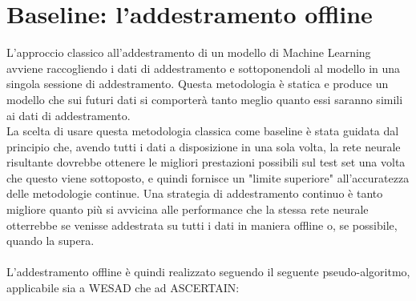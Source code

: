 \section{Baseline: l'addestramento offline}
L'approccio classico all'addestramento di un modello di Machine Learning avviene raccogliendo i dati di addestramento e sottoponendoli al modello in una singola sessione di addestramento. Questa metodologia è statica e produce un modello che sui futuri dati si comporterà tanto meglio quanto essi saranno simili ai dati di addestramento.\\
La scelta di usare questa metodologia classica come baseline è stata guidata dal principio che, avendo tutti i dati a disposizione in una sola volta, la rete neurale risultante dovrebbe ottenere le migliori prestazioni possibili sul test set una volta che questo viene sottoposto, e quindi fornisce un "limite superiore" all'accuratezza delle metodologie continue. Una strategia di addestramento continuo è tanto migliore quanto più si avvicina alle performance che la stessa rete neurale otterrebbe se venisse addestrata su tutti i dati in maniera offline o, se possibile, quando la supera.\\\\
L'addestramento offline è quindi realizzato seguendo il seguente pseudo-algoritmo, applicabile sia a WESAD che ad ASCERTAIN:
